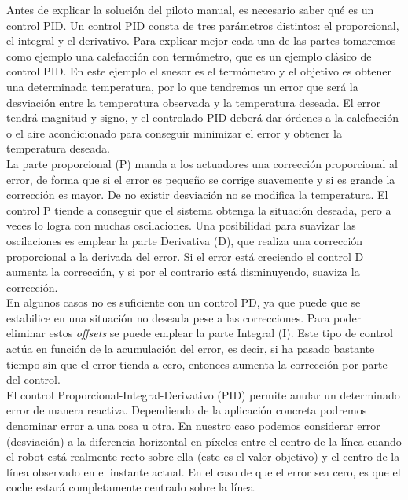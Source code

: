 Antes de explicar la solución del piloto manual, es necesario saber qué es un control PID. Un control PID consta de tres parámetros distintos: el proporcional, el integral y el derivativo. Para explicar mejor cada una de las partes tomaremos como ejemplo una calefacción con termómetro, que es un ejemplo clásico de control PID.  En este ejemplo el snesor es el termómetro y el objetivo es obtener una determinada temperatura, por lo que tendremos un error que será la desviación entre la temperatura observada y la temperatura deseada. El error tendrá magnitud y signo, y el controlado PID deberá dar órdenes a la calefacción o el aire acondicionado para conseguir minimizar el error y obtener la temperatura deseada.\\

La parte proporcional (P) manda a los actuadores una corrección proporcional al error, de forma que si el error es pequeño se corrige suavemente y si es grande la corrección es mayor. De no existir desviación no se modifica la temperatura. El control P tiende a conseguir que el sistema obtenga la situación deseada, pero a veces lo logra con muchas oscilaciones. Una posibilidad para suavizar las oscilaciones es emplear la parte Derivativa (D), que realiza una corrección proporcional a la derivada del error. Si el error está creciendo el control D aumenta la corrección, y si por el contrario está disminuyendo, suaviza la corrección.\\

En algunos casos no es suficiente con un control PD, ya que puede que se estabilice en una situación no deseada pese a las correcciones. Para poder eliminar estos \textit{offsets} se puede emplear la parte Integral (I). Este tipo de control actúa en función de la acumulación del error, es decir, si ha pasado bastante tiempo sin que el error tienda a cero, entonces aumenta la corrección por parte del control.\\

El control Proporcional-Integral-Derivativo (PID) permite anular un determinado error de manera reactiva. Dependiendo de la aplicación concreta podremos denominar error a una cosa u otra. En nuestro caso podemos considerar error (desviación) a la diferencia horizontal en píxeles entre el centro de la línea cuando el robot está realmente recto sobre ella (este es el valor objetivo) y el centro de la línea observado en el instante actual. En el caso de que el error sea cero, es que el coche estará completamente centrado sobre la línea.\\


